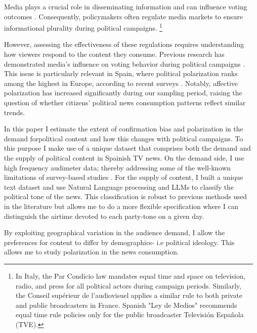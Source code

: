 \documentclass[12pt]{article}
\begin{document}
Media plays a crucial role in disseminating information and can influence voting outcomes \citep{Zhuravskaya2020}. Consequently, policymakers often regulate media markets to ensure informational plurality during political campaigns.   \footnote{In Italy, the Par Condicio law mandates equal time and space on television, radio, and press for all political actors during campaign periods. Similarly, the Conseil supérieur de l’audiovisuel applies a similar rule to both private and public broadcasters in France. Spanish "Ley de Medios" recommends equal time rule policies only for the public broadcaster Televisión Española (TVE).}

However, assessing the effectiveness of these regulations requires understanding how viewers respond to the content they consume. Previous research has demonstrated media’s influence on voting behavior during political campaigns . This issue is particularly relevant in Spain, where political polarization ranks among the highest in Europe, according to recent surveys \citep{edelman_trust_2023}. Notably, affective polarization has increased significantly during our sampling period, raising the question of whether citizens’ political news consumption patterns reflect similar trends.


In this paper I estimate the extent of confirmation bias and polarization in the demand forpolitical content and how this changes with political campaigns. To this purpose I make use of a unique dataset that comprises both the demand and the supply of political content in Spainish TV news. On the demand side, I use high frequency audimeter data; thereby addressing some of the well-known limitations of survey-based studies \citep{prior}. For the supply of content, I built a unique text dataset and use Natural Language processing and LLMs to classify the political tone of the news. This classification is robust to previous methods used in the literature but allows me to do a more flexible specification where I can distinguish the airtime devoted to each party-tone on a given day. 

By exploiting geographical variation in the audience demand, I allow the preferences for content to differ by demographics- i.e political ideology. This allows me to study polarization in the news consumption. 
\end{document}
